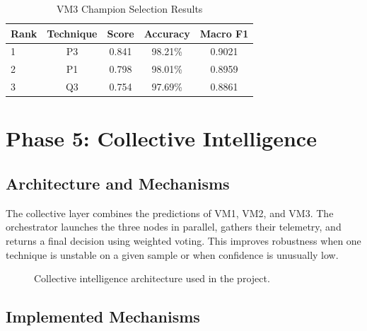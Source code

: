 \documentclass[12pt, a4paper]{article}
\begin{document}
\begin{table}[H]
\centering
\caption{VM3 Champion Selection Results}
\begin{tabular}{lcccc}
\toprule
\textbf{Rank} & \textbf{Technique} & \textbf{Score} & \textbf{Accuracy} & \textbf{Macro F1} \\
\midrule
1 & P3 & 0.841 & 98.21\% & 0.9021 \\
2 & P1 & 0.798 & 98.01\% & 0.8959 \\
3 & Q3 & 0.754 & 97.69\% & 0.8861 \\
\bottomrule
\end{tabular}
\label{tab:vm3_selection}
\end{table}

\section{Phase 5: Collective Intelligence}

\subsection{Architecture and Mechanisms}

The collective layer combines the predictions of VM1, VM2, and VM3. The orchestrator launches the three nodes in parallel, gathers their telemetry, and returns a final decision using weighted voting. This improves robustness when one technique is unstable on a given sample or when confidence is unusually low.

\begin{figure}[H]
\centering
{}
\caption{Collective intelligence architecture used in the project.}
\label{fig:collective_architecture}
\end{figure}


\subsection{Implemented Mechanisms}
\end{document}
